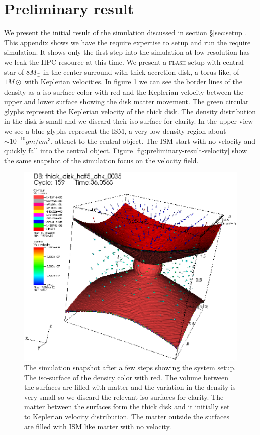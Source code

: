 \documentclass[a4paper,12pt,modern]{aastex62}
\begin{document}
\section{Preliminary result\label{app:preliminarty result}}
We present the initial result of the simulation discussed in section \S\ref{sec:setup}. This appendix shows we have the require expertise to setup and run the require simulation. It shows only the first step into the simulation at low resolution has we leak the HPC resource at this time. We present a \textsc{flash} setup with central star of $8M_\odot$ in the center surround with thick accretion disk, a torus like, of $1M\odot$ with Keplerian velocities. In figure \ref{fig:preliminary-result-density} we can see the border lines of the density as a iso-surface color with red and the Keplerian velocity between the upper and lower surface showing the disk matter movement. The green circular glyphs represent the Keplerian velocity of the thick disk. The density distribution in the disk is small and we discard their iso-surface for clarity. In the upper view we see a blue glyphs represent the ISM, a very low density region about $\sim10^{-10} gm/cm^3$, attract to the central object. The ISM start with no velocity and quickly fall into the central object. Figure \ref{fig:preliminary-result-velocity} show the same snapshot of the simulation focus on the velocity field.  

\begin{figure}[ht!]
\includegraphics[width=\linewidth]{visit_dens_1.eps}
\caption{The simulation snapshot after a few steps showing the system setup. The iso-surface of the density color with red. The volume between the surfaces are filled with matter and the variation in the density is very small so we discard the relevant iso-surfaces for clarity. The matter between the surfaces form the thick disk and it initially set to Keplerian velocity distribution. The matter outside the surfaces are filled with ISM like matter with no velocity.}\label{fig:preliminary-result-density}
\end{figure}
\end{document}
